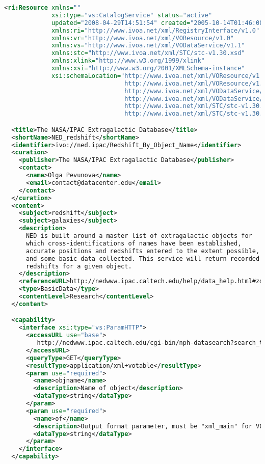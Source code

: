 \documentclass[11pt,a4paper]{ivoa}
\begin{document}
\begin{lstlisting}[language=XML]
<ri:Resource xmlns="" 
             xsi:type="vs:CatalogService" status="active" 
             updated="2008-04-29T14:51:54" created="2005-10-14T01:46:00"
             xmlns:ri="http://www.ivoa.net/xml/RegistryInterface/v1.0" 
             xmlns:vr="http://www.ivoa.net/xml/VOResource/v1.0" 
             xmlns:vs="http://www.ivoa.net/xml/VODataService/v1.1" 
             xmlns:stc="http://www.ivoa.net/xml/STC/stc-v1.30.xsd" 
             xmlns:xlink="http://www.w3.org/1999/xlink"
             xmlns:xsi="http://www.w3.org/2001/XMLSchema-instance"
             xsi:schemaLocation="http://www.ivoa.net/xml/VOResource/v1.0
                                 http://www.ivoa.net/xml/VOResource/v1.0
                                 http://www.ivoa.net/xml/VODataService/v1.1
                                 http://www.ivoa.net/xml/VODataService/v1.1
                                 http://www.ivoa.net/xml/STC/stc-v1.30.xsd
                                 http://www.ivoa.net/xml/STC/stc-v1.30.xsd">

  <title>The NASA/IPAC Extragalactic Database</title>
  <shortName>NED_redshift</shortName>
  <identifier>ivo://ned.ipac/Redshift_By_Object_Name</identifier>
  <curation>
    <publisher>The NASA/IPAC Extragalactic Database</publisher>
    <contact>
      <name>Olga Pevunova</name>
      <email>contact@datacenter.edu</email>
    </contact>
  </curation>
  <content>
    <subject>redshift</subject>
    <subject>galaxies</subject>
    <description>
      NED is built around a master list of extragalactic objects for
      which cross-identifications of names have been established,
      accurate positions and redshifts entered to the extent possible,
      and some basic data collected. This service will return recorded 
      redshifts for a given object.
    </description>
    <referenceURL>http://nedwww.ipac.caltech.edu/help/data_help.html#zdat</referenceURL>
    <type>BasicData</type>
    <contentLevel>Research</contentLevel>
  </content>

  <capability>
    <interface xsi:type="vs:ParamHTTP">
      <accessURL use="base">
         http://nedwww.ipac.caltech.edu/cgi-bin/nph-datasearch?search_type=Redshifts&amp;amp;
      </accessURL>
      <queryType>GET</queryType>
      <resultType>application/xml+votable</resultType>
      <param use="required">
        <name>objname</name>
        <description>Name of object</description>
        <dataType>string</dataType>
      </param>
      <param use="required">
        <name>of</name>
        <description>Output format parameter, must be "xml_main" for VOTable output.</description>
        <dataType>string</dataType>
      </param>
    </interface>
  </capability>


\end{lstlisting}
\end{document}
